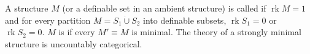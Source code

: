 A structure $M$ (or a definable set in an ambient structure) is called  if $\operatorname{rk} M = 1$ and for every partition $M = S_1 \dot{\cup} S_2$ into definable subsets, $\operatorname{rk} S_1 = 0$ or $\operatorname{rk} S_2 = 0$. $M$ is  if every $M' \equiv M$ is minimal. The theory of a strongly minimal structure is uncountably categorical.
